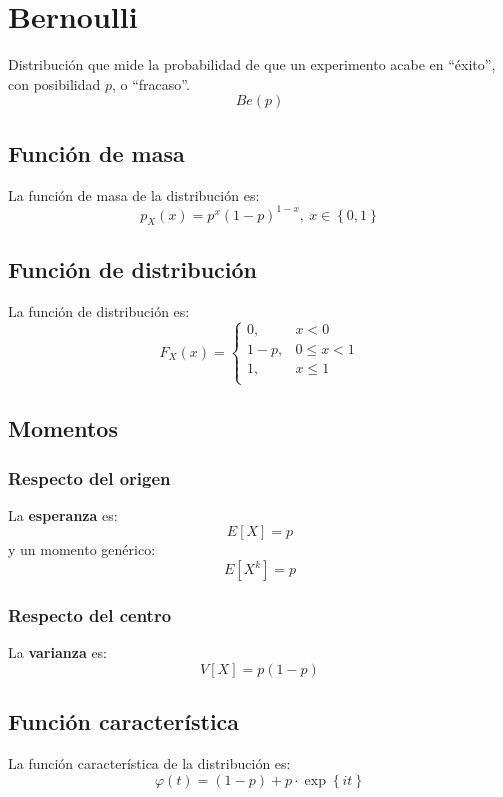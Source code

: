 \section{Bernoulli}
\label{sec:bernoulli}
Distribución que mide la probabilidad de que un experimento acabe en ``éxito'',
con posibilidad $p$, o ``fracaso''. 
\[
\boxed{Be\left( p \right)}
\]

\subsection{Función de masa}
La función de masa de la distribución es:
\[
p_X \left( x \right) = p^x \left( 1-p \right)^{1-x},\ x \in \left\{ 0, 1 \right\}
\]

\subsection{Función de distribución}
La función de distribución es:
\[
F_X\left( x \right) = \begin{cases}
    0, &x < 0\\ 
    1 - p, &0 \le x < 1\\
    1, &x \le 1 \\
\end{cases}
\]

\subsection{Momentos}

\subsubsection*{Respecto del origen}
La \textbf{esperanza} es: 
\[
    E\left[ X \right] = p
\]
y un momento genérico: 
\[
    E\left[ X^k \right] = p
\]
\subsubsection*{Respecto del centro}
La \textbf{varianza} es:
\[
    V\left[ X \right] = p\left( 1-p \right)
\]

\subsection{Función característica}
La función característica de la distribución es:
\[
\varphi\left( t \right) = \left( 1-p \right) + p \cdot \exp\left\{ it \right\}
\]

